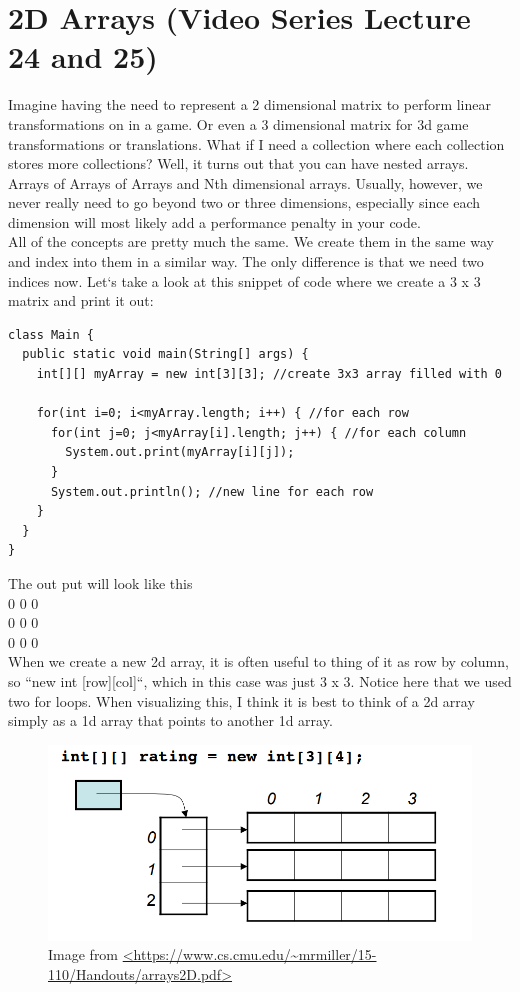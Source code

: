 \documentclass[11]{article}
\begin{document}
\section{2D Arrays (Video Series Lecture 24 and 25)}
Imagine having the need to represent a 2 dimensional matrix to perform linear transformations on in a game. Or even a 3 dimensional matrix for 3d game transformations or translations. What if I need a collection where each collection stores more collections? Well, it turns out that you can have nested arrays. Arrays of Arrays of Arrays and Nth dimensional arrays. Usually, however, we never really need to go beyond two or three dimensions, especially since each dimension will most likely add a performance penalty in your code.\\

All of the concepts are pretty much the same. We create them in the same way and index into them in a similar way. The only difference is that we need two indices now. Let`s take a look at this snippet of code where we create a $3$ x $3$ matrix and print it out:

\begin{lstlisting}
class Main {
  public static void main(String[] args) {
    int[][] myArray = new int[3][3]; //create 3x3 array filled with 0

    for(int i=0; i<myArray.length; i++) { //for each row
      for(int j=0; j<myArray[i].length; j++) { //for each column
        System.out.print(myArray[i][j]);
      }
      System.out.println(); //new line for each row
    } 
  }
}
\end{lstlisting}

The out put will look like this\\
0 0 0\\0 0 0\\ 0 0 0\\

When we create a new 2d array, it is often useful to thing of it as row by column, so ``new int [row][col]``, which in this case was just 3 x 3. Notice here that we used two for loops. When visualizing this, I think it is best to think of a 2d array simply as a 1d array that points to another 1d array.

\begin{figure}[H]
	\centering
	\includegraphics[scale=0.4]{2darray.png}
	\caption{Image from \url{<https://www.cs.cmu.edu/~mrmiller/15-110/Handouts/arrays2D.pdf>}}
\end{figure}
\end{document}
